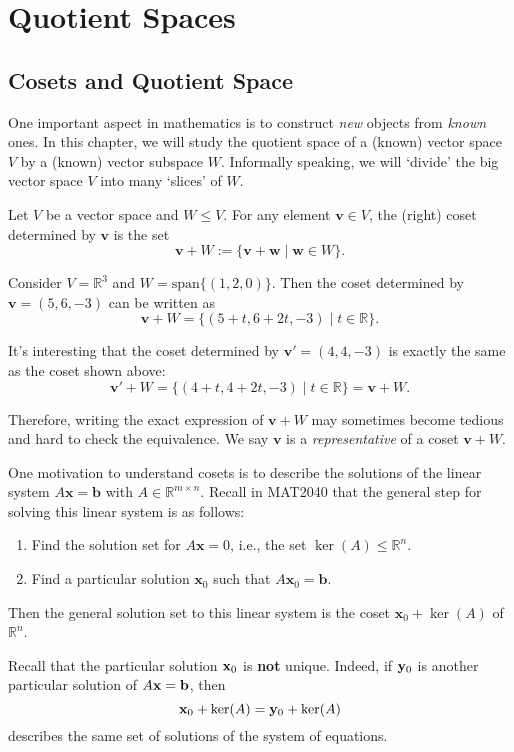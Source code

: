 \chapter{Quotient Spaces}

\section{Cosets and Quotient Space}
One important aspect in mathematics is to construct {\it new} objects from {\it known} ones. In this chapter, we will study the quotient space of a (known) vector space $V$ by a (known) vector subspace $W$. Informally speaking, we will `divide' the big vector space $V$ into many `slices' of $W$.


\begin{definition}[Coset]
Let \( V \) be a vector space and \( W \leq V \). For any element \( \mathbf{v} \in V \), the (right) coset determined by \( \mathbf{v} \) is the set
\[
\mathbf{v} + W := \{ \mathbf{v} + \mathbf{w} \mid \mathbf{w} \in W \}.
\]
\end{definition}

\begin{example}
Consider \( V = \mathbb{R}^3 \) and \( W = \mathrm{span}\{(1,2,0)\} \). Then the coset determined by \( \mathbf{v} = (5,6,-3) \) can be written as
\[
\mathbf{v} + W = \{ (5 + t, 6 + 2t, -3) \mid t \in \mathbb{R} \}.
\]

It’s interesting that the coset determined by \( \mathbf{v}' = (4,4,-3) \) is exactly the same as the coset shown above:
\[
\mathbf{v}' + W = \{ (4 + t, 4 + 2t, -3) \mid t \in \mathbb{R} \} = \mathbf{v} + W.
\]

Therefore, writing the exact expression of \( \mathbf{v} + W \) may sometimes become tedious and hard to check the equivalence. We say \( \mathbf{v} \) is a \emph{representative} of a coset \( \mathbf{v} + W \). 
\end{example}

\begin{example}
One motivation to understand cosets is to describe the solutions of the linear system \( A \mathbf{x} = \mathbf{b} \) with \( A \in \mathbb{R}^{m \times n} \). 
Recall in MAT2040 that the general step for solving this linear system is as follows:
\begin{enumerate}
    \item Find the solution set for \( A \mathbf{x} = 0 \), i.e., the set \( \ker(A) \leq \mathbb{R}^n\).
    \item Find a particular solution \( \mathbf{x}_0 \) such that \( A \mathbf{x}_0 = \mathbf{b} \).
\end{enumerate}
\noindent Then the general solution set to this linear system is the coset 
$\mathbf{x}_0 + \ker(A)$
of $\mathbb{R}^n$.

Recall that the particular solution ${\bf x}_0$ is {\bf not} unique. Indeed, if ${\bf y}_0$ is another particular solution of $A{\bf x} = {\bf b}$, then 
$${\bf x}_0 + \ker(A) = {\bf y}_0 + \ker(A)$$
describes the same set of solutions of the system of equations.
\end{example}

